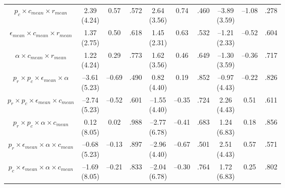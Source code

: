 \documentclass[
  11pt,
]{article}
\begin{document}
\begin{landscape}
\begin{ThreePartTable}
\begin{longtable}[t]{cccccccccc}
$p_c \times c_{mean} \times r_{mean}$ & \makecell[c]{2.39\\(4.24)} & 0.57 & .572 & \makecell[c]{2.64\\(3.56)} & 0.74 & .460 & \makecell[c]{–3.89\\(3.59)} & –1.08 & .278\\
\addlinespace
$\epsilon_{mean} \times c_{mean} \times r_{mean}$ & \makecell[c]{1.37\\(2.75)} & 0.50 & .618 & \makecell[c]{1.45\\(2.31)} & 0.63 & .532 & \makecell[c]{–1.21\\(2.33)} & –0.52 & .604\\
$\alpha \times c_{mean} \times r_{mean}$ & \makecell[c]{1.22\\(4.24)} & 0.29 & .773 & \makecell[c]{1.62\\(3.56)} & 0.46 & .649 & \makecell[c]{–1.30\\(3.59)} & –0.36 & .717\\
$p_r \times p_c \times \epsilon_{mean} \times \alpha$ & \makecell[c]{–3.61\\(5.23)} & –0.69 & .490 & \makecell[c]{0.82\\(4.40)} & 0.19 & .852 & \makecell[c]{–0.97\\(4.43)} & –0.22 & .826\\
$p_r \times p_c \times \epsilon_{mean} \times c_{mean}$ & \makecell[c]{–2.74\\(5.23)} & –0.52 & .601 & \makecell[c]{–1.55\\(4.40)} & –0.35 & .724 & \makecell[c]{2.26\\(4.43)} & 0.51 & .611\\
$p_r \times p_c \times \alpha \times c_{mean}$ & \makecell[c]{0.12\\(8.05)} & 0.02 & .988 & \makecell[c]{–2.77\\(6.78)} & –0.41 & .683 & \makecell[c]{1.24\\(6.83)} & 0.18 & .856\\
\addlinespace
$p_r \times \epsilon_{mean} \times \alpha \times c_{mean}$ & \makecell[c]{–0.68\\(5.23)} & –0.13 & .897 & \makecell[c]{–2.96\\(4.40)} & –0.67 & .501 & \makecell[c]{2.51\\(4.43)} & 0.57 & .571\\
$p_c \times \epsilon_{mean} \times \alpha \times c_{mean}$ & \makecell[c]{–1.69\\(8.05)} & –0.21 & .833 & \makecell[c]{–2.04\\(6.78)} & –0.30 & .764 & \makecell[c]{1.72\\(6.83)} & 0.25 & .802\\

\end{longtable}
\end{ThreePartTable}
\end{landscape}
\end{document}
